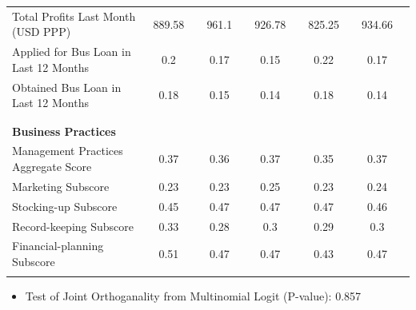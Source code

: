 \documentclass[hideothersubsections, usenames,dvipsnames,10pt]{beamer}
\begin{document}
\begin{frame}
{{\begin{table}
\begin{tabular}{l*{10}{c}}
Total Profits Last Month (USD PPP)						& 889.58	&& 961.1 &&	926.78	&& 825.25	&& 934.66 \\
Applied for Bus Loan in Last 12 Months
			    & 0.2	&& 0.17	&& 0.15	&& 0.22	&& 0.17 \\
													
Obtained Bus Loan in Last 12 Months
						& 0.18 &&	0.15	&& 0.14	&& 0.18	&& 0.14 \\[0.5ex]
\\
\\
\textbf{Business Practices} \\
Management Practices Aggregate Score											& 0.37	&& 0.36	&& 0.37	&& 0.35	&& 0.37 \\
\hspace{3mm}Marketing Subscore												& 0.23	&& 0.23 &&	0.25	&& 0.23	&& 0.24 \\
\hspace{3mm}Stocking-up	Subscore											& 0.45	&& 0.47	&& 0.47	&& 0.47	&& 0.46 \\
\hspace{3mm}Record-keeping Subscore											& 0.33	&& 0.28	&& 0.3	&& 0.29 &&	0.3 \\
\hspace{3mm}Financial-planning Subscore									& 0.51	&& 0.47	&& 0.47	&& 0.43	&& 0.47 \\
&		&&		&&		&& \\
		\hline
		\hline
			\end{tabular}
		
		
	\end{table}}}
\begin{itemize}
\item Test of Joint Orthoganality from Multinomial Logit (P-value): 0.857
\end{itemize}
\end{frame}
\end{document}
